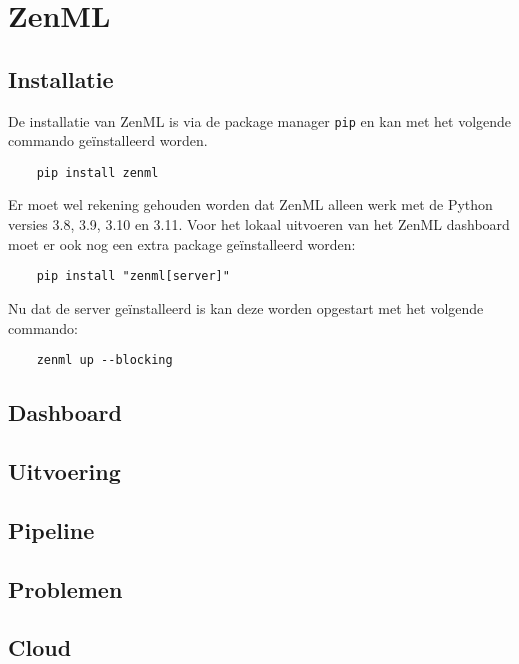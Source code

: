 \section{ZenML}
\subsection{Installatie}
De installatie van ZenML is via de package manager \texttt{pip} en kan met het volgende commando geïnstalleerd worden.
\begin{verbatim}
    pip install zenml
\end{verbatim}
Er moet wel rekening gehouden worden dat ZenML alleen werk met de Python versies 3.8, 3.9, 3.10 en 3.11.
Voor het lokaal uitvoeren van het ZenML dashboard moet er ook nog een extra package geïnstalleerd worden:
\begin{verbatim}
    pip install "zenml[server]"
\end{verbatim}

Nu dat de server geïnstalleerd is kan deze worden opgestart met het volgende commando: 
\begin{verbatim}
    zenml up --blocking
\end{verbatim}

\subsection{Dashboard}
\subsection{Uitvoering}
\subsection{Pipeline}
\subsection{Problemen}
\subsection{Cloud}
